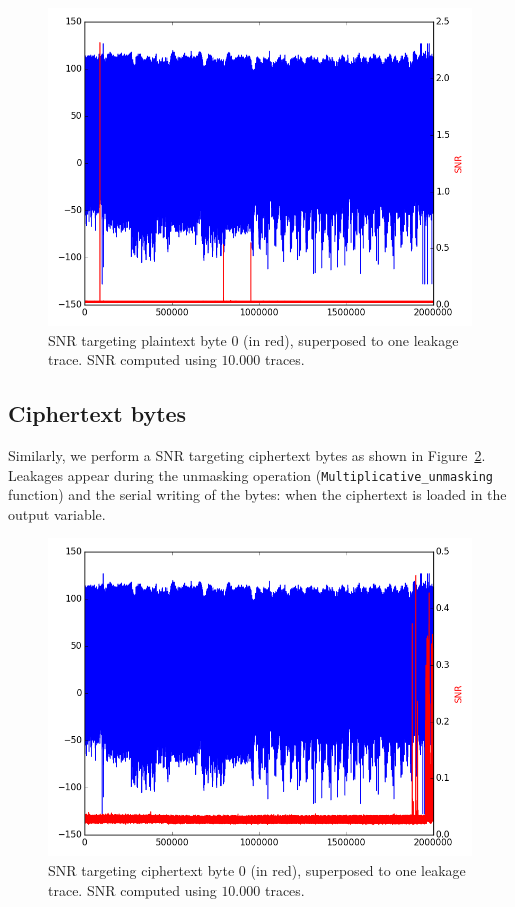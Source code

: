 \begin{figure}[H]
	\centering 
	\includegraphics[scale=0.35]{figures/2Mpts/SNRP0_10ktraces.png}
	\caption{SNR targeting plaintext byte 0 (in red), superposed to one leakage trace. SNR computed using $10.000$ traces.}
	\label{fig:SNR_P0}
\end{figure}

\subsection{Ciphertext bytes}
Similarly, we perform a SNR targeting ciphertext bytes as shown in Figure~\ref{fig:SNR_C0}.
Leakages appear during the unmasking operation (\texttt{Multiplicative\_unmasking} function) and the serial writing of the bytes: when the ciphertext is loaded in the output variable.  %

\begin{figure}[H]
	\centering 
	\includegraphics[scale=0.35]{figures/2Mpts/SNRC0_10ktraces.png}
	\caption{SNR targeting ciphertext byte 0 (in red), superposed to one leakage trace. SNR computed using $10.000$ traces.}
	\label{fig:SNR_C0}
\end{figure}

